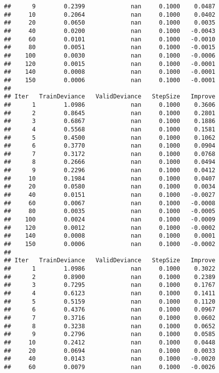 \documentclass[
]{article}
\begin{document}
\begin{verbatim}
##      9        0.2399             nan     0.1000    0.0487
##     10        0.2064             nan     0.1000    0.0402
##     20        0.0650             nan     0.1000    0.0035
##     40        0.0200             nan     0.1000   -0.0043
##     60        0.0101             nan     0.1000   -0.0010
##     80        0.0051             nan     0.1000   -0.0015
##    100        0.0030             nan     0.1000   -0.0006
##    120        0.0015             nan     0.1000   -0.0001
##    140        0.0008             nan     0.1000   -0.0001
##    150        0.0006             nan     0.1000   -0.0001
## 
## Iter   TrainDeviance   ValidDeviance   StepSize   Improve
##      1        1.0986             nan     0.1000    0.3606
##      2        0.8645             nan     0.1000    0.2801
##      3        0.6867             nan     0.1000    0.1886
##      4        0.5568             nan     0.1000    0.1581
##      5        0.4500             nan     0.1000    0.1062
##      6        0.3770             nan     0.1000    0.0904
##      7        0.3172             nan     0.1000    0.0768
##      8        0.2666             nan     0.1000    0.0494
##      9        0.2296             nan     0.1000    0.0412
##     10        0.1984             nan     0.1000    0.0407
##     20        0.0580             nan     0.1000    0.0034
##     40        0.0151             nan     0.1000   -0.0027
##     60        0.0067             nan     0.1000   -0.0008
##     80        0.0035             nan     0.1000   -0.0005
##    100        0.0024             nan     0.1000   -0.0009
##    120        0.0012             nan     0.1000   -0.0002
##    140        0.0008             nan     0.1000    0.0001
##    150        0.0006             nan     0.1000   -0.0002
## 
## Iter   TrainDeviance   ValidDeviance   StepSize   Improve
##      1        1.0986             nan     0.1000    0.3022
##      2        0.8900             nan     0.1000    0.2389
##      3        0.7295             nan     0.1000    0.1767
##      4        0.6123             nan     0.1000    0.1411
##      5        0.5159             nan     0.1000    0.1120
##      6        0.4376             nan     0.1000    0.0967
##      7        0.3716             nan     0.1000    0.0602
##      8        0.3238             nan     0.1000    0.0652
##      9        0.2796             nan     0.1000    0.0585
##     10        0.2412             nan     0.1000    0.0448
##     20        0.0694             nan     0.1000    0.0033
##     40        0.0143             nan     0.1000   -0.0020
##     60        0.0079             nan     0.1000   -0.0026

\end{verbatim}
\end{document}
